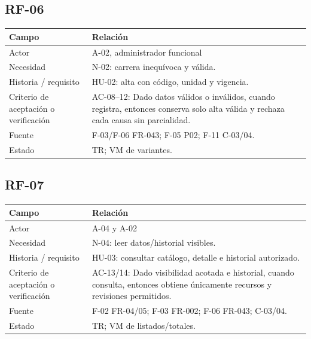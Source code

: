 \documentclass[12pt,a4paper]{report}
\begin{document}
\subsection{RF-06}\label{matriz-RF-06}

{\def\LTcaptype{none} %
\begin{longtable}[]{@{}
  >{\raggedright\arraybackslash}p{}
  >{\raggedright\arraybackslash}p{}@{}}
\toprule\noalign{}
\begin{minipage}[b]{\linewidth}\raggedright
Campo
\end{minipage} & \begin{minipage}[b]{\linewidth}\raggedright
Relación
\end{minipage} \\
\midrule\noalign{}
\endhead
\bottomrule\noalign{}
\endlastfoot
Actor & A-02, administrador funcional \\
Necesidad & N-02: carrera inequívoca y válida. \\
Historia / requisito & HU-02: alta con código, unidad y vigencia. \\
Criterio de aceptación o verificación & AC-08--12: Dado datos válidos
o inválidos, cuando registra, entonces conserva solo alta válida y
rechaza cada causa sin parcialidad. \\
Fuente & F-03/F-06 FR-043; F-05 P02; F-11 C-03/04. \\
Estado & TR; VM de variantes. \\
\end{longtable}
}

\subsection{RF-07}\label{matriz-RF-07}

{\def\LTcaptype{none} %
\begin{longtable}[]{@{}
  >{\raggedright\arraybackslash}p{}
  >{\raggedright\arraybackslash}p{}@{}}
\toprule\noalign{}
\begin{minipage}[b]{\linewidth}\raggedright
Campo
\end{minipage} & \begin{minipage}[b]{\linewidth}\raggedright
Relación
\end{minipage} \\
\midrule\noalign{}
\endhead
\bottomrule\noalign{}
\endlastfoot
Actor & A-04 y A-02 \\
Necesidad & N-04: leer datos/historial visibles. \\
Historia / requisito & HU-03: consultar catálogo, detalle e historial
autorizado. \\
Criterio de aceptación o verificación & AC-13/14: Dado visibilidad
acotada e historial, cuando consulta, entonces obtiene únicamente
recursos y revisiones permitidos. \\
Fuente & F-02 FR-04/05; F-03 FR-002; F-06 FR-043; C-03/04. \\
Estado & TR; VM de listados/totales. \\
\end{longtable}
}
\end{document}

